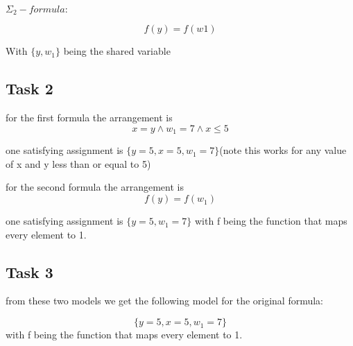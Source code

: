 \documentclass{article}
\begin{document}
$\Sigma_2 - formula:$

$$f(y) = f(w1)$$

With $\{y , w_1\}$ being the shared variable

\subsection{Task 2}

for the first formula the arrangement is 
$$ x = y \land w_1 = 7 \land x \leq 5$$

one satisfying assignment is $\{y = 5, x = 5, w_1 = 7\}$(note this works for any value of x and y less than or equal to 5)

for the second formula  the arrangement is
$$f(y) = f(w_1)$$

one satisfying assignment is $\{y = 5, w_1 = 7\}$ with f being the function that maps every element to 1.

\subsection{Task 3}

from these two models we get the following model for the original formula:

$$\{y = 5, x = 5, w_1 = 7\}$$ with f being the function that maps every element to 1.
\end{document}
